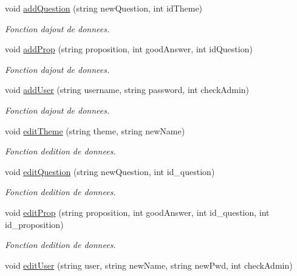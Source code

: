 \begin{DoxyCompactItemize}
void \mbox{\hyperlink{classDatabase_afcefe4bac17bcc073c8f14679c375a35}{add\+Question}} (string new\+Question, int id\+Theme)
\begin{DoxyCompactList}\small\item\em Fonction d\textquotesingle{}ajout de donnees. \end{DoxyCompactList}\item 
void \mbox{\hyperlink{classDatabase_adb9d2a51e963cf93bcfc0c47ce2e1d72}{add\+Prop}} (string proposition, int good\+Answer, int id\+Question)
\begin{DoxyCompactList}\small\item\em Fonction d\textquotesingle{}ajout de donnees. \end{DoxyCompactList}\item 
void \mbox{\hyperlink{classDatabase_a5e69b420a56127d86aca142683e03cbf}{add\+User}} (string username, string password, int check\+Admin)
\begin{DoxyCompactList}\small\item\em Fonction d\textquotesingle{}ajout de donnees. \end{DoxyCompactList}\item 
void \mbox{\hyperlink{classDatabase_a88ac52b22562c45d1e54610ee5ac4026}{edit\+Theme}} (string theme, string new\+Name)
\begin{DoxyCompactList}\small\item\em Fonction d\textquotesingle{}edition de donnees. \end{DoxyCompactList}\item 
void \mbox{\hyperlink{classDatabase_ac402414daf1786c1a9189fe29c18e345}{edit\+Question}} (string new\+Question, int id\+\_\+question)
\begin{DoxyCompactList}\small\item\em Fonction d\textquotesingle{}edition de donnees. \end{DoxyCompactList}\item 
void \mbox{\hyperlink{classDatabase_a63fefba403dae2942256ee1704ee282a}{edit\+Prop}} (string proposition, int good\+Answer, int id\+\_\+question, int id\+\_\+proposition)
\begin{DoxyCompactList}\small\item\em Fonction d\textquotesingle{}edition de donnees. \end{DoxyCompactList}\item 
void \mbox{\hyperlink{classDatabase_a2c742ca4a931b676f099951fe9dea256}{edit\+User}} (string user, string new\+Name, string new\+Pwd, int check\+Admin)

\end{DoxyCompactItemize}
